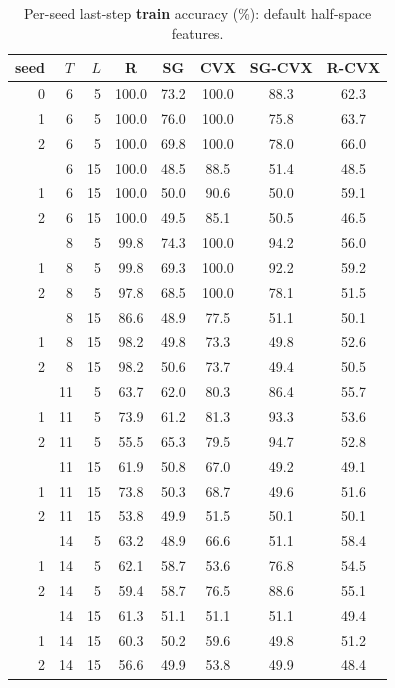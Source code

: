\documentclass[11pt]{article}
\begin{document}
\begin{table}[p]
\centering
\caption{Per-seed last-step \textbf{train} accuracy (\%): default half-space features.}
\label{tab:xor-train-perseed-default}
\begin{tabular}{rrrccccc}
\toprule
seed & $T$ & $L$ & R & SG & CVX & SG-CVX & R-CVX \\
\midrule
0 & 6 & 5 & 100.0 & 73.2 & 100.0 & 88.3 & 62.3 \\
1 & 6 & 5 & 100.0 & 76.0 & 100.0 & 75.8 & 63.7 \\
2 & 6 & 5 & 100.0 & 69.8 & 100.0 & 78.0 & 66.0 \\
\addlinespace
0 & 6 & 15 & 100.0 & 48.5 & 88.5 & 51.4 & 48.5 \\
1 & 6 & 15 & 100.0 & 50.0 & 90.6 & 50.0 & 59.1 \\
2 & 6 & 15 & 100.0 & 49.5 & 85.1 & 50.5 & 46.5 \\
\addlinespace
0 & 8 & 5 & 99.8 & 74.3 & 100.0 & 94.2 & 56.0 \\
1 & 8 & 5 & 99.8 & 69.3 & 100.0 & 92.2 & 59.2 \\
2 & 8 & 5 & 97.8 & 68.5 & 100.0 & 78.1 & 51.5 \\
\addlinespace
0 & 8 & 15 & 86.6 & 48.9 & 77.5 & 51.1 & 50.1 \\
1 & 8 & 15 & 98.2 & 49.8 & 73.3 & 49.8 & 52.6 \\
2 & 8 & 15 & 98.2 & 50.6 & 73.7 & 49.4 & 50.5 \\
\addlinespace
0 & 11 & 5 & 63.7 & 62.0 & 80.3 & 86.4 & 55.7 \\
1 & 11 & 5 & 73.9 & 61.2 & 81.3 & 93.3 & 53.6 \\
2 & 11 & 5 & 55.5 & 65.3 & 79.5 & 94.7 & 52.8 \\
\addlinespace
0 & 11 & 15 & 61.9 & 50.8 & 67.0 & 49.2 & 49.1 \\
1 & 11 & 15 & 73.8 & 50.3 & 68.7 & 49.6 & 51.6 \\
2 & 11 & 15 & 53.8 & 49.9 & 51.5 & 50.1 & 50.1 \\
\addlinespace
0 & 14 & 5 & 63.2 & 48.9 & 66.6 & 51.1 & 58.4 \\
1 & 14 & 5 & 62.1 & 58.7 & 53.6 & 76.8 & 54.5 \\
2 & 14 & 5 & 59.4 & 58.7 & 76.5 & 88.6 & 55.1 \\
\addlinespace
0 & 14 & 15 & 61.3 & 51.1 & 51.1 & 51.1 & 49.4 \\
1 & 14 & 15 & 60.3 & 50.2 & 59.6 & 49.8 & 51.2 \\
2 & 14 & 15 & 56.6 & 49.9 & 53.8 & 49.9 & 48.4 \\
\bottomrule
\end{tabular}
\end{table}
\end{document}
